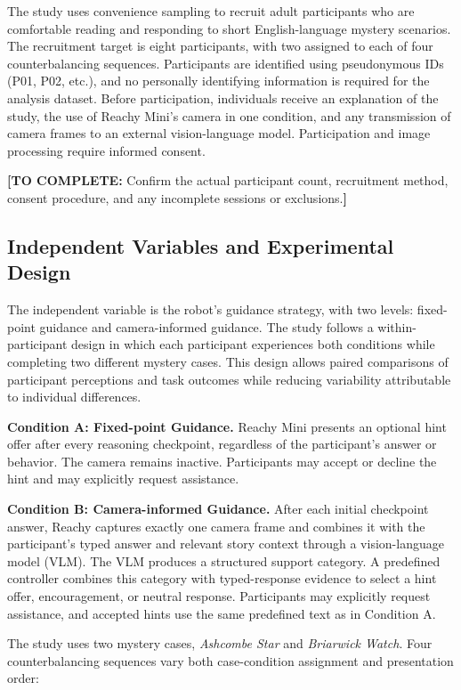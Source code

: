 \documentclass[conference]{IEEEtran}
\newcommand{\drafttodo}[1]{\par\smallskip\noindent\textcolor{red!65!black}{\textbf{[TO COMPLETE:} #1\textbf{]}}\par\smallskip}
\begin{document}
The study uses convenience sampling to recruit adult participants who are comfortable reading and responding to short English-language mystery scenarios. The recruitment target is eight participants, with two assigned to each of four counterbalancing sequences. Participants are identified using pseudonymous IDs (P01, P02, etc.), and no personally identifying information is required for the analysis dataset. Before participation, individuals receive an explanation of the study, the use of Reachy Mini's camera in one condition, and any transmission of camera frames to an external vision-language model. Participation and image processing require informed consent.

\drafttodo{Confirm the actual participant count, recruitment method, consent procedure, and any incomplete sessions or exclusions.}

\subsection{Independent Variables and Experimental Design}

The independent variable is the robot's guidance strategy, with two levels: fixed-point guidance and camera-informed guidance. The study follows a within-participant design in which each participant experiences both conditions while completing two different mystery cases. This design allows paired comparisons of participant perceptions and task outcomes while reducing variability attributable to individual differences.

\noindent\textbf{Condition A: Fixed-point Guidance.}
Reachy Mini presents an optional hint offer after every reasoning checkpoint, regardless of the participant's answer or behavior. The camera remains inactive. Participants may accept or decline the hint and may explicitly request assistance.

\noindent\textbf{Condition B: Camera-informed Guidance.}
After each initial checkpoint answer, Reachy captures exactly one camera frame and combines it with the participant's typed answer and relevant story context through a vision-language model (VLM). The VLM produces a structured support category. A predefined controller combines this category with typed-response evidence to select a hint offer, encouragement, or neutral response. Participants may explicitly request assistance, and accepted hints use the same predefined text as in Condition A.

The study uses two mystery cases, \emph{Ashcombe Star} and \emph{Briarwick Watch}. Four counterbalancing sequences vary both case-condition assignment and presentation order:
\end{document}
